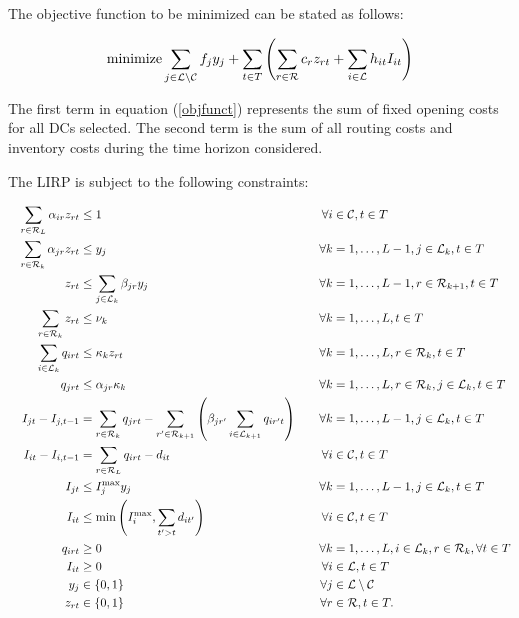 \documentclass[a4paper,10pt]{article}
\begin{document}
\begin{linenumbers}
The objective function to be minimized can be stated as follows: 
 
\begin{equation} \label{objfunct}
    \text{minimize} \sum_{j\in \mathcal{L} \setminus \mathcal{C}} f_{j} y_{j} +\sum_{t\in T} \left( \sum_{r\in \mathcal{R}} c_r z_{rt} + \sum_{i\in \mathcal{L}} h_{it} I_{it}\right)
    \end{equation} 
    
    The first term in equation (\ref{objfunct}) represents the sum of fixed opening costs for all DCs selected. 
    The second term is the sum of all routing costs and inventory costs during the time horizon considered. 
    
  The LIRP is subject to the following constraints:
    
    \begin{alignat}{3}
&&\sum_{r\in \mathcal{R}_L} \alpha_{ir} z_{rt} &\leq 1 						&\forall i&\in \mathcal{C}, t \in T  					\label{const:singleroutecustomers}\\
&&\sum_{r\in \mathcal{R}_k} \alpha_{jr} z_{rt} &\leq y_j 					&\forall k&=1,\ldots,L-1, j\in \mathcal{L}_k, t \in T  \label{const:singleroutedc}\\
&&z_{rt} 					&\leq \sum_{j\in\mathcal{L}_{k}}\beta_{jr}y_j 	&\forall k&=1,\ldots,L-1,r\in \mathcal{R}_{k+1}, t \in T \label{const:startfromopendepots}\\
&&\sum_{r\in \mathcal{R}_k} z_{rt} &\leq 	\nu_k							&\forall k&=1,\ldots,L, t \in T  				\label{const:fleetcapa}\\
&&\sum_{i\in \mathcal{L}_k} q_{irt}   		&\leq \kappa_k z_{rt} 			&\forall k&=1,\ldots,L,  r\in \mathcal{R}_k, t \in T 	\label{const:deliveryUB}\\
&&q_{jrt}   		&\leq \alpha_{jr}\kappa_k  						&\forall k&=1,\ldots,L,  r\in \mathcal{R}_k, j \in \mathcal{L}_k, t \in T	\label{const:deliveryConstLoc}\\
&&I_{jt} - I_{j,t-1} &= \sum_{r\in\mathcal{R}_k} q_{jrt} 	- \sum_{r'\in \mathcal{R}_{k+1}}\left(\beta_{jr'} \sum_{i\in \mathcal{L}_{k+1}}q_{ir't}\right)\quad 						&\forall k&=1,\ldots,L-1, j\in \mathcal{L}_k, t \in T 				\label{const:invflowdepots}\\
&&I_{it} - I_{i,t-1} &= \sum_{r\in \mathcal{R}_L} q_{irt} - d_{it} 			&\forall i&\in \mathcal{C},  t \in T					\label{const:invflowcustomers}\\
&&I_{jt}	&\leq I_j^{\max} y_j  									&\forall k&=1,\ldots,L-1,  j\in \mathcal{L}_k, t \in T \label{const:invdepotUB}\\	
&&I_{it} 	&\leq \min\left(I_i^{\max}, \sum_{t' > t}d_{it'}\right)	&\forall i&\in \mathcal{C},  t \in T					\label{const:invcustUB}\\
&&q_{irt}			&\geq 0 										&\forall k&=1,\ldots,L,  i\in \mathcal{L}_k,  r\in \mathcal{R}_k,\forall t \in T	\label{const:upos}	\\
&&I_{it}			&\geq 0 										&\forall i &\in \mathcal{L},  t \in T					\label{const:invCpos}	\\
&&y_{j}				& \in \{0,1\} 								&\forall j&\in \mathcal{L}\setminus\mathcal{C}						\label{const:ybool}\\	
&&z_{rt}			&\in \{0,1\} 									&\forall r&\in \mathcal{R},  t \in T.					\label{const:zbool}
\end{alignat}



\end{linenumbers}
\end{document}
